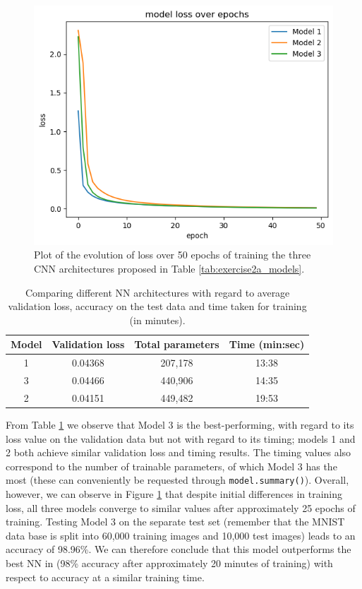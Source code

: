 \documentclass[12pt]{article}
\begin{document}
\begin{figure}[ht]
\centering
   \includegraphics[scale=0.7]{graphics/loss_over_epochs_exercise_2a.png}
    \caption{Plot of the evolution of loss over 50 epochs of training the three CNN architectures proposed in Table \ref{tab:exercise2a_models}.}
    \label{fig:exercise2a_loss_epochs}
\end{figure}

\begin{table}[ht]
    \centering
    \begin{tabular}{c|c|c|c}
        \textbf{Model}              & \textbf{Validation loss} & \textbf{Total parameters} &   \textbf{Time (min:sec)} \\ \hline
        1 &  0.04368 & 207,178 &  13:38           \\  
        3 &  0.04466 & 440,906 & 14:35           \\ 
        2 &  0.04151 & 449,482 & 19:53           \\
    \end{tabular}
     \caption{Comparing different NN architectures with regard to average validation loss, accuracy on the test data and time taken for training (in minutes).}
        \label{tab:exercise2a_values}
\end{table}

\noindent From Table \ref{tab:exercise2a_values} we observe that Model 3 is the best-performing, with regard to its loss value on the validation data but not with regard to its timing; models 1 and 2 both achieve similar validation loss and timing results. The timing values also correspond to the number of trainable parameters, of which Model 3 has the most (these can conveniently be requested through \texttt{model.summary()}). Overall, however, we can observe in Figure \ref{fig:exercise2a_loss_epochs} that despite initial differences in training loss, all three models converge to similar values after approximately 25 epochs of training. Testing Model 3 on the separate test set (remember that the MNIST data base is split into 60,000 training images and 10,000 test images) leads to an accuracy of 98.96\%. We can therefore conclude that this model outperforms the best NN in \cite{JG} (98\% accuracy after approximately 20 minutes of training) with respect to accuracy at a similar training time.
\end{document}
